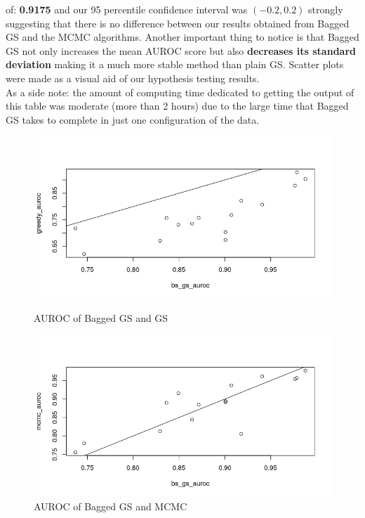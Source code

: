\documentclass{article}
\begin{document}
	of: \textbf{0.9175} and our 95 percentile confidence interval was $(-0.2,
	0.2)$ strongly suggesting that there is no difference between our
	results obtained from Bagged GS and the MCMC algorithms. Another important
	thing to notice is that Bagged GS not only increases the mean AUROC score but
	also \textbf{decreases its standard deviation} making it a much more stable method
	than plain GS. Scatter plots were made as a visual aid of our hypothesis testing results.
	\\
	As a side note: the amount of computing time dedicated to getting the output
	of this table was moderate (more than 2 hours) due to the large time that Bagged GS takes to
	complete in just one configuration of the data.
	\begin{figure}[ht]
		\begin{minipage}{0.60\textwidth}
			\includegraphics[width=.95\linewidth]{scatter_gs_vs_bs_gs}
			\centering
			\caption{AUROC of Bagged GS and GS}
			\label{fig:scatterBS_GS}
		\end{minipage}\hfill
		\begin{minipage}{0.60\textwidth}
			\includegraphics[width=.95\linewidth]{scatter_mcmc_vs_bs_gs}
			\centering
			\caption{AUROC of Bagged GS and MCMC}
			\label{fig:scatterMCMC_GS}
    \end{minipage}
	\end{figure}
\end{document}
